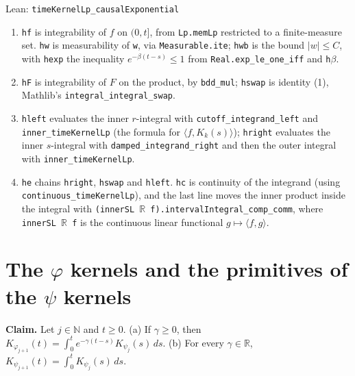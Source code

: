 \documentclass[11pt,a4paper]{article}
\begin{document}
\begin{leanbox}{Lean: \texttt{timeKernelLp\_\allowbreak{}causalExponential}}
\begin{enumerate}
\item \texttt{hf} is integrability of \(f\) on \((0,t]\), from \texttt{Lp.\allowbreak{}mem\allowbreak{}Lp} restricted to a finite-measure set. \texttt{hw} is measurability of \texttt{w}, via \texttt{Measurable.\allowbreak{}ite}; \texttt{hwb} is the bound \(|w|\le C\), with \texttt{hexp} the inequality \(e^{-\beta(t-s)}\le1\) from \texttt{Real.\allowbreak{}exp\_\allowbreak{}le\_\allowbreak{}one\_\allowbreak{}iff} and \texttt{h\ensuremath{\beta}}.

\item \texttt{h\allowbreak{}F} is integrability of \(F\) on the product, by \texttt{bdd\_\allowbreak{}mul}; \texttt{hswap} is identity (1), Mathlib's \texttt{integral\_\allowbreak{}integral\_\allowbreak{}swap}.

\item \texttt{hleft} evaluates the inner \(r\)-integral with \texttt{cutoff\_\allowbreak{}integrand\_\allowbreak{}left} and \texttt{inner\_\allowbreak{}time\allowbreak{}Kernel\allowbreak{}Lp} (the formula for \(\langle f,K_k(s)\rangle\)); \texttt{hright} evaluates the inner \(s\)-integral with \texttt{damped\_\allowbreak{}integrand\_\allowbreak{}right} and then the outer integral with \texttt{inner\_\allowbreak{}time\allowbreak{}Kernel\allowbreak{}Lp}.

\item \texttt{he} chains \texttt{hright}, \texttt{hswap} and \texttt{hleft}. \texttt{hc} is continuity of the integrand (using \texttt{continuous\_\allowbreak{}time\allowbreak{}Kernel\allowbreak{}Lp}), and the last line moves the inner product inside the integral with \texttt{(inner\allowbreak{}SL \ensuremath{\mathbb R} f).\allowbreak{}interval\allowbreak{}Integral\_\allowbreak{}comp\_\allowbreak{}comm}, where \texttt{inner\allowbreak{}SL \ensuremath{\mathbb R} f} is the continuous linear functional \(g\mapsto\langle f,g\rangle\).

\end{enumerate}
\end{leanbox}

\section{\texorpdfstring{The \(\varphi\) kernels and the primitives of the \(\psi\) kernels}{The φ kernels and the primitives of the ψ kernels}}


\textbf{Claim.} Let \(j\in\mathbb N\) and \(t\ge0\). (a) If \(\gamma\ge0\), then \(K_{\varphi_{j+1}}(t)=\int_0^te^{-\gamma(t-s)}K_{\psi_j}(s)\,ds\). (b) For every \(\gamma\in\mathbb R\), \(K_{\psi_{j+1}}(t)=\int_0^tK_{\psi_j}(s)\,ds\).
\end{document}
